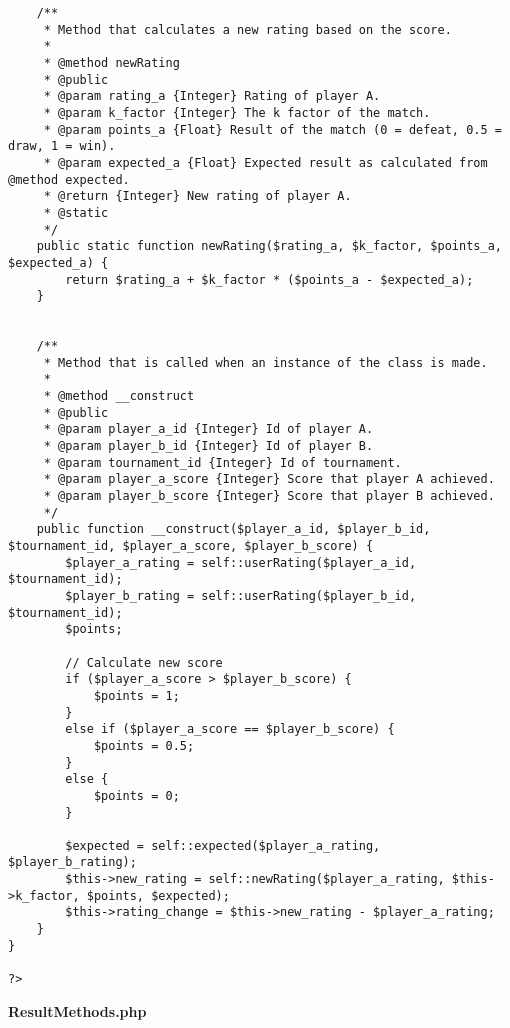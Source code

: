 {\begin{lstlisting}
	/**
	 * Method that calculates a new rating based on the score.
	 *
	 * @method newRating
	 * @public
	 * @param rating_a {Integer} Rating of player A.
	 * @param k_factor {Integer} The k factor of the match.
	 * @param points_a {Float} Result of the match (0 = defeat, 0.5 = draw, 1 = win).
	 * @param expected_a {Float} Expected result as calculated from @method expected.
	 * @return {Integer} New rating of player A.
	 * @static
	 */
	public static function newRating($rating_a, $k_factor, $points_a, $expected_a) {
		return $rating_a + $k_factor * ($points_a - $expected_a);
	}


	/**
	 * Method that is called when an instance of the class is made.
	 *
	 * @method __construct
	 * @public
	 * @param player_a_id {Integer} Id of player A.
	 * @param player_b_id {Integer} Id of player B.
	 * @param tournament_id {Integer} Id of tournament.
	 * @param player_a_score {Integer} Score that player A achieved.
	 * @param player_b_score {Integer} Score that player B achieved.
	 */
	public function __construct($player_a_id, $player_b_id, $tournament_id, $player_a_score, $player_b_score) {
		$player_a_rating = self::userRating($player_a_id, $tournament_id);
		$player_b_rating = self::userRating($player_b_id, $tournament_id);
		$points;

		// Calculate new score
		if ($player_a_score > $player_b_score) {
			$points = 1;
		}
		else if ($player_a_score == $player_b_score) {
			$points = 0.5;
		}
		else {
			$points = 0;
		}

		$expected = self::expected($player_a_rating, $player_b_rating);
		$this->new_rating = self::newRating($player_a_rating, $this->k_factor, $points, $expected);
		$this->rating_change = $this->new_rating - $player_a_rating;
	}
}

?>\end{lstlisting}
}
\textbf{ResultMethods.php}

